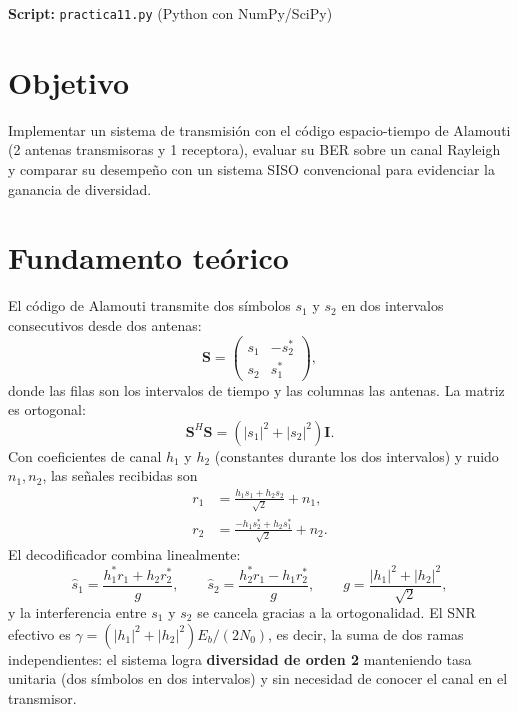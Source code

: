 \documentclass[11pt,a4paper]{article}
\begin{document}

\textbf{Script:} \texttt{practica11.py} (Python con NumPy/SciPy)

\section{Objetivo}

Implementar un sistema de transmisión con el código espacio-tiempo de Alamouti (2 antenas
transmisoras y 1 receptora), evaluar su BER sobre un canal Rayleigh y comparar su desempeño
con un sistema SISO convencional para evidenciar la ganancia de diversidad.

\section{Fundamento teórico}

El código de Alamouti transmite dos símbolos $s_1$ y $s_2$ en dos intervalos consecutivos
desde dos antenas:
\begin{equation}
  \mathbf{S} =
  \begin{pmatrix}
    s_1 & -s_2^{*}\\
    s_2 & s_1^{*}
  \end{pmatrix},
\end{equation}
donde las filas son los intervalos de tiempo y las columnas las antenas. La matriz es
ortogonal:
\begin{equation}
  \mathbf{S}^{H}\mathbf{S} = \left(|s_1|^2+|s_2|^2\right)\mathbf{I}.
\end{equation}
Con coeficientes de canal $h_1$ y $h_2$ (constantes durante los dos intervalos) y ruido
$n_1,n_2$, las señales recibidas son
\begin{align}
  r_1 &= \frac{h_1 s_1 + h_2 s_2}{\sqrt{2}} + n_1,\\
  r_2 &= \frac{-h_1 s_2^{*} + h_2 s_1^{*}}{\sqrt{2}} + n_2.
\end{align}
El decodificador combina linealmente:
\begin{equation}
  \hat{s}_1 = \frac{h_1^{*}r_1 + h_2 r_2^{*}}{g},
  \qquad
  \hat{s}_2 = \frac{h_2^{*}r_1 - h_1 r_2^{*}}{g},
  \qquad
  g = \frac{|h_1|^2+|h_2|^2}{\sqrt{2}},
\end{equation}
y la interferencia entre $s_1$ y $s_2$ se cancela gracias a la ortogonalidad. El SNR
efectivo es $\gamma = (|h_1|^2+|h_2|^2)E_b/(2N_0)$, es decir, la suma de dos ramas
independientes: el sistema logra \textbf{diversidad de orden 2} manteniendo tasa unitaria
(dos símbolos en dos intervalos) y sin necesidad de conocer el canal en el transmisor.
\end{document}
